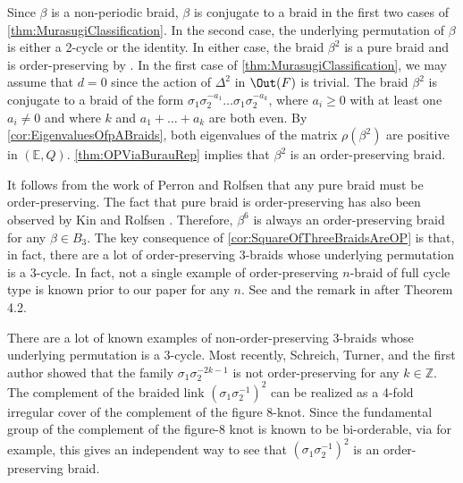 \documentclass{amsart}
\makeatletter
\renewenvironment{proof}[1][\proofname]{%
   \par\pushQED{\qed}\normalfont%
   \topsep6\p@\@plus6\p@\relax
   \trivlist\item[\hskip\labelsep\bfseries#1\@addpunct{.}]%
   \ignorespaces
}{%
   \popQED\endtrivlist\@endpefalse
}
\makeatother
\begin{document}
\begin{proof}[Proof of \cref{cor:SquareOfThreeBraidsAreOP}]
    Since $\beta$ is a non-periodic braid, $\beta$ is conjugate to a braid in the first two cases of \cref{thm:MurasugiClassification}. In the second case, the underlying permutation of $\beta$ is either a 2-cycle or the identity. In either case, the braid $\beta^2$ is a pure braid and is order-preserving by \cite[Prop 4.6]{KinRolfsen18}. In the first case of \cref{thm:MurasugiClassification}, we may assume that $d =0$ since the action of $\Delta^2$ in $\Out(F)$ is trivial. The braid $\beta^2$ is conjugate to a braid of the form $\sigma_1\sigma_2^{-a_1}\dots\sigma_1\sigma_2^{-a_k}$, where $a_i \geq 0$ with at least one $a_i \neq 0$ and where $k$ and $a_1+\dots+a_k$ are both even. By \cref{cor:EigenvaluesOfpABraids}, both eigenvalues of the matrix $\rho(\beta^2)$ are positive in $(\mathbb{E},Q)$. \cref{thm:OPViaBurauRep} implies that $\beta^2$ is an order-preserving braid. 
\end{proof}



\begin{remark}
    It follows from the work of Perron and Rolfsen that any pure braid must be order-preserving. The fact that pure braid is order-preserving has also been observed by Kin and Rolfsen \cite[Prop 4.6]{KinRolfsen18}. Therefore, $\beta^6$ is always an order-preserving braid for any $\beta \in B_3$. The key consequence of \cref{cor:SquareOfThreeBraidsAreOP} is that, in fact, there are a lot of order-preserving 3-braids whose underlying permutation is a 3-cycle. In fact, not a single example of order-preserving $n$-braid of full cycle type is known prior to our paper for any $n$. See \cite[Question 6.10]{KinRolfsen18} and the remark in \cite{CaiClayRolfsen} after Theorem 4.2.
\end{remark}

\begin{remark}
    There are a lot of known examples of non-order-preserving 3-braids whose underlying permutation is a 3-cycle. Most recently, Schreich, Turner, and the first author showed that the family $\sigma_1\sigma_2^{-2k-1}$ is not order-preserving for any $k \in \mathbb{Z}$. The complement of the braided link $(\sigma_1\sigma_2^{-1})^2$ can be realized as a 4-fold irregular cover of the complement of the figure 8-knot. Since the fundamental group of the complement of the figure-8 knot is known to be bi-orderable, via \cite[Theorem 1.1]{PerronRolfsen03} for example, this gives an independent way to see that $(\sigma_1\sigma_2^{-1})^2$ is an order-preserving braid. 
\end{remark}
\end{document}
